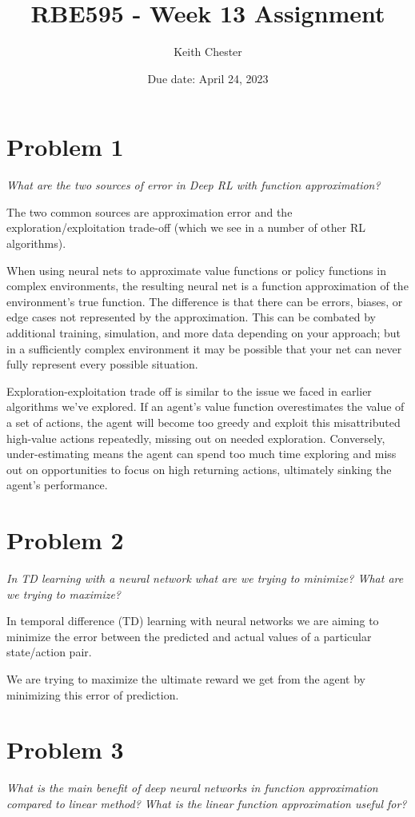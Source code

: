 \documentclass{article}
\title{RBE595 - Week 13 Assignment}
\author{Keith Chester}
\date{Due date: April 24, 2023}
\begin{document}
\maketitle

\section*{Problem 1}
\textit{What are the two sources of error in Deep RL with function approximation?}

The two common sources are approximation error and the exploration/exploitation trade-off (which we see in a number of other RL algorithms).

When using neural nets to approximate value functions or policy functions in complex environments, the resulting neural net is a function approximation of the environment's true function. The difference is that there can be errors, biases, or edge cases not represented by the approximation. This can be combated by additional training, simulation, and more data depending on your approach; but in a sufficiently complex environment it may be possible that your net can never fully represent every possible situation.

Exploration-exploitation trade off is similar to the issue we faced in earlier algorithms we've explored. If an agent's value function overestimates the value of a set of actions, the agent will become too greedy and exploit this misattributed high-value actions repeatedly, missing out on needed exploration. Conversely, under-estimating means the agent can spend too much time exploring and miss out on opportunities to focus on high returning actions, ultimately sinking the agent's performance.

\section*{Problem 2}
\textit{In TD learning with a neural network what are we trying to minimize? What are we trying to maximize?}

In temporal difference (TD) learning with neural networks we are aiming to minimize the error between the predicted and actual values of a particular state/action pair.

We are trying to maximize the ultimate reward we get from the agent by minimizing this error of prediction.


\section*{Problem 3}
\textit{What is the main benefit of deep neural networks in function approximation compared to linear method? What is the linear function approximation useful for?}
\end{document}
